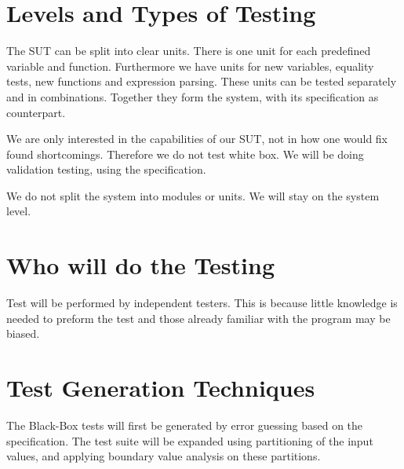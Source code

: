 \documentclass[11pt,a4paper]{article}
\begin{document}
\section{Levels and Types of Testing} \label{levels}

The SUT can be split into clear units. There is one unit for each predefined variable and function. Furthermore we have units for new variables, equality tests, new functions and expression parsing. These units can be tested separately and in combinations. Together they form the system, with its specification as counterpart.

\fi




We are only interested in the capabilities of our SUT, not in how one would fix found shortcomings. Therefore we do not test white box. We will be doing validation testing, using the specification.

We do not split the system into modules or units. We will stay on the system level.


\section{Who will do the Testing}

Test will be performed by independent testers. This is because little
knowledge is needed to preform the test and those already familiar
with the program may be biased.     \label{sec:test-generation}





\section{Test Generation Techniques}
The Black-Box tests will first be generated by error guessing based on the specification. The test suite will be expanded using partitioning of the input values, and applying boundary value analysis on these partitions.
\end{document}
